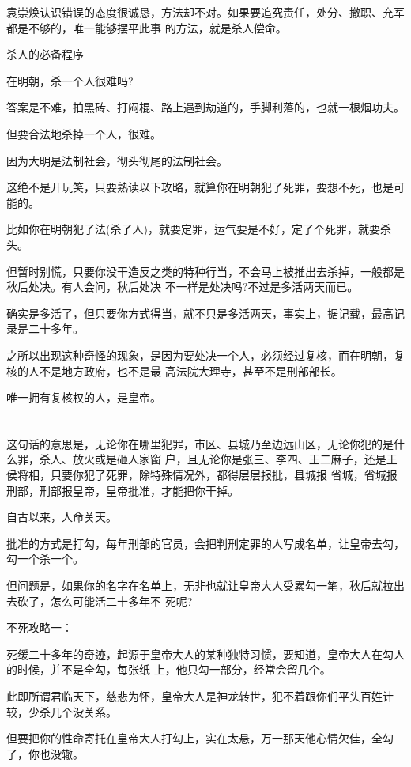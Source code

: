 \documentclass[11pt,a4paper,onecolumn]{article}
\begin{document}
袁崇焕认识错误的态度很诚恳，方法却不对。如果要追究责任，处分、撤职、充军都是不够的，唯一能够摆平此事
的方法，就是杀人偿命。

杀人的必备程序

在明朝，杀一个人很难吗?

答案是不难，拍黑砖、打闷棍、路上遇到劫道的，手脚利落的，也就一根烟功夫。

但要合法地杀掉一个人，很难。

因为大明是法制社会，彻头彻尾的法制社会。

这绝不是开玩笑，只要熟读以下攻略，就算你在明朝犯了死罪，要想不死，也是可能的。

比如你在明朝犯了法(杀了人)，就要定罪，运气要是不好，定了个死罪，就要杀头。

但暂时别慌，只要你没干造反之类的特种行当，不会马上被推出去杀掉，一般都是秋后处决。有人会问，秋后处决
不一样是处决吗?不过是多活两天而已。

确实是多活了，但只要你方式得当，就不只是多活两天，事实上，据记载，最高记录是二十多年。

之所以出现这种奇怪的现象，是因为要处决一个人，必须经过复核，而在明朝，复核的人不是地方政府，也不是最
高法院大理寺，甚至不是刑部部长。

唯一拥有复核权的人，是皇帝。

\section[\thesection]{}

这句话的意思是，无论你在哪里犯罪，市区、县城乃至边远山区，无论你犯的是什么罪，杀人、放火或是砸人家窗
户，且无论你是张三、李四、王二麻子，还是王侯将相，只要你犯了死罪，除特殊情况外，都得层层报批，县城报
省城，省城报刑部，刑部报皇帝，皇帝批准，才能把你干掉。

自古以来，人命关天。

批准的方式是打勾，每年刑部的官员，会把判刑定罪的人写成名单，让皇帝去勾，勾一个杀一个。

但问题是，如果你的名字在名单上，无非也就让皇帝大人受累勾一笔，秋后就拉出去砍了，怎么可能活二十多年不
死呢?

不死攻略一：

死缓二十多年的奇迹，起源于皇帝大人的某种独特习惯，要知道，皇帝大人在勾人的时候，并不是全勾，每张纸
上，他只勾一部分，经常会留几个。

此即所谓君临天下，慈悲为怀，皇帝大人是神龙转世，犯不着跟你们平头百姓计较，少杀几个没关系。

但要把你的性命寄托在皇帝大人打勾上，实在太悬，万一那天他心情欠佳，全勾了，你也没辙。
\end{document}
